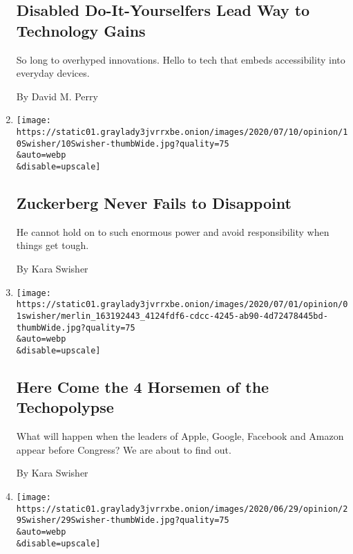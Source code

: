 \begin{enumerate}
  \hypertarget{disabled-do-it-yourselfers-lead-way-to-technology-gains}{%
  \subsection{Disabled Do-It-Yourselfers Lead Way to Technology
  Gains}\label{disabled-do-it-yourselfers-lead-way-to-technology-gains}}

  So long to overhyped innovations. Hello to tech that embeds
  accessibility into everyday devices.

  By David M. Perry
\item
  \href{/2020/07/10/opinion/facebook-zuckerberg.html}{}

  \texttt{[image: https://static01.graylady3jvrrxbe.onion/images/2020/07/10/opinion/10Swisher/10Swisher-thumbWide.jpg?quality=75\\\&auto=webp\\\&disable=upscale]}

  \hypertarget{zuckerberg-never-fails-to-disappoint}{%
  \subsection{Zuckerberg Never Fails to
  Disappoint}\label{zuckerberg-never-fails-to-disappoint}}

  He cannot hold on to such enormous power and avoid responsibility when
  things get tough.

  By Kara Swisher
\item
  \href{/2020/07/01/opinion/anti-trust-tech-hearing-facebook.html}{}

  \texttt{[image: https://static01.graylady3jvrrxbe.onion/images/2020/07/01/opinion/01swisher/merlin\_163192443\_4124fdf6-cdcc-4245-ab90-4d72478445bd-thumbWide.jpg?quality=75\\\&auto=webp\\\&disable=upscale]}

  \hypertarget{here-come-the-4-horsemen-of-the-techopolypse}{%
  \subsection{Here Come the 4 Horsemen of the
  Techopolypse}\label{here-come-the-4-horsemen-of-the-techopolypse}}

  What will happen when the leaders of Apple, Google, Facebook and
  Amazon appear before Congress? We are about to find out.

  By Kara Swisher
\item
  \href{/2020/06/30/opinion/facebook-zuckerberg-labeling.html}{}

  \texttt{[image: https://static01.graylady3jvrrxbe.onion/images/2020/06/29/opinion/29Swisher/29Swisher-thumbWide.jpg?quality=75\\\&auto=webp\\\&disable=upscale]}


\end{enumerate}
